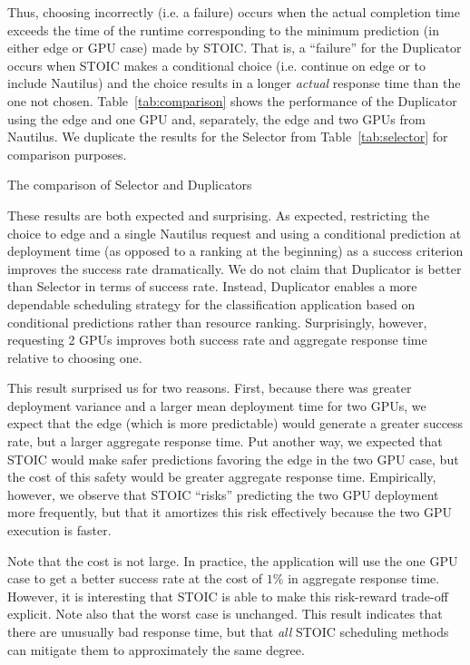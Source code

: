 Thus, choosing incorrectly (i.e. a failure) occurs when the actual completion
time exceeds the time of the runtime corresponding to the minimum prediction
(in either edge or GPU case) made by STOIC. That is, a ``failure'' for the
Duplicator occurs when STOIC makes a conditional choice (i.e. continue on edge
or to include Nautilus) and the choice results in a longer \textit{actual}
response time than the one not chosen. Table~\ref{tab:comparison} shows the
performance of the Duplicator using the edge and one GPU and, separately, the
edge and two GPUs from Nautilus. We duplicate the results for the Selector
from Table~\ref{tab:selector} for comparison purposes.

\begin{table}[t] 
\centering
\captionsetup{justification=centering}

\caption{
The comparison of Selector and Duplicators}
\label{tab:comparison}
\end{table}

These results are both expected and surprising. As expected, restricting the
choice to edge and a single Nautilus request and using a conditional
prediction at deployment time (as opposed to a ranking at the beginning) as a
success criterion improves the success rate dramatically. We do not claim that
Duplicator is better than Selector in terms of success rate. Instead,
Duplicator enables a more dependable scheduling strategy for the
classification application based on
conditional predictions rather than resource ranking. Surprisingly, however,
requesting 2 GPUs improves both success rate and aggregate response time
relative to choosing one.

This result surprised us for two reasons. First, because there was greater
deployment variance and a larger mean deployment time for two GPUs, we expect
that the edge (which is more predictable) would generate a greater success
rate, but a larger aggregate response time. Put another way, we expected that
STOIC would make safer predictions favoring the edge in the two GPU case, but
the cost of this safety would be greater aggregate response time. Empirically,
however, we observe that STOIC ``risks'' predicting the two GPU deployment
more frequently, but that it amortizes this risk effectively because the two
GPU execution is faster.

Note that the cost is not large. In practice, the 
application
will use the one
GPU case to get a better success rate at the cost of $1\%$ in aggregate
response time.  However, it is interesting that STOIC is able to make this
risk-reward trade-off explicit. Note also that the worst case is unchanged.
This result indicates that there are unusually bad response time, but that
\textit{all} STOIC scheduling methods can mitigate them to approximately the
same degree.

